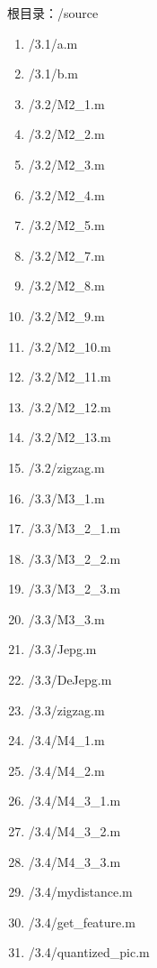 \documentclass[a4paper]{article}
\begin{document}
		根目录：/source
		\begin{enumerate}
			\item /3.1/a.m
			\item /3.1/b.m
			\item /3.2/M2\_1.m
			\item /3.2/M2\_2.m
			\item /3.2/M2\_3.m
			\item /3.2/M2\_4.m
			\item /3.2/M2\_5.m
			\item /3.2/M2\_7.m
			\item /3.2/M2\_8.m
			\item /3.2/M2\_9.m
			\item /3.2/M2\_10.m
			\item /3.2/M2\_11.m
			\item /3.2/M2\_12.m
			\item /3.2/M2\_13.m
			\item /3.2/zigzag.m
			\item /3.3/M3\_1.m
			\item /3.3/M3\_2\_1.m
			\item /3.3/M3\_2\_2.m
			\item /3.3/M3\_2\_3.m
			\item /3.3/M3\_3.m
			\item /3.3/Jepg.m
			\item /3.3/DeJepg.m
			\item /3.3/zigzag.m
			\item /3.4/M4\_1.m
			\item /3.4/M4\_2.m
			\item /3.4/M4\_3\_1.m
			\item /3.4/M4\_3\_2.m
			\item /3.4/M4\_3\_3.m
			\item /3.4/mydistance.m
			\item /3.4/get\_feature.m
			\item /3.4/quantized\_pic.m
		\end{enumerate}
		
\end{document}
